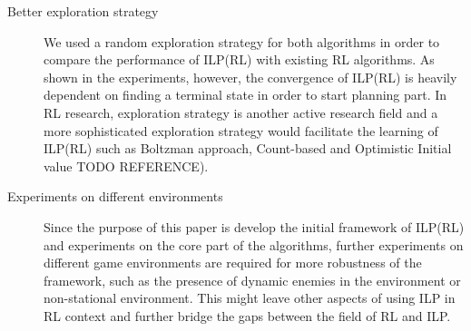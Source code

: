 \begin{description}
    \item[Better exploration strategy]
    We used a random exploration strategy for both algorithms in order to compare the performance of ILP(RL) with existing RL algorithms. 
    As shown in the experiments, however, the convergence of ILP(RL) is heavily dependent on finding a terminal state in order to start planning part.
    In RL research, exploration strategy is another active research field and a more sophisticated exploration strategy would facilitate the learning of ILP(RL)
    such as Boltzman approach, Count-based and Optimistic Initial value TODO REFERENCE).
    \item[Experiments on different environments]
    Since the purpose of this paper is develop the initial framework of ILP(RL) and experiments on the core part of the algorithms,
    further experiments on different game environments are required for more robustness of the framework, such as the presence of dynamic enemies in the environment or non-stational environment.
    This might leave other aspects of using ILP in RL context and further bridge the gaps between the field of RL and ILP.



\end{description}
